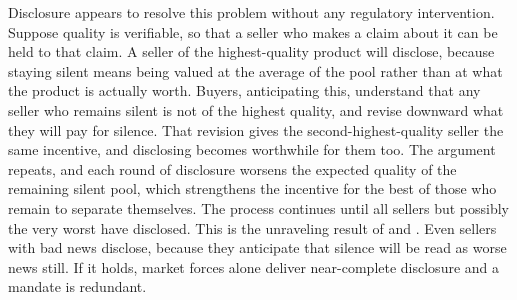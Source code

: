 Disclosure appears to resolve this problem without any regulatory intervention. Suppose quality
is verifiable, so that a seller who makes a claim about it can be held to that claim. A seller
of the highest-quality product will disclose, because staying silent means being valued at the
average of the pool rather than at what the product is actually worth. Buyers, anticipating
this, understand that any seller who remains silent is not of the highest quality, and revise
downward what they will pay for silence. That revision gives the second-highest-quality seller
the same incentive, and disclosing becomes worthwhile for them too. The argument repeats, and each
round of disclosure worsens the expected quality of the remaining silent pool, which strengthens
the incentive for the best of those who remain to separate themselves. The process continues
until all sellers but possibly the very worst have disclosed. This is the unraveling result of
\citet{grossman_informational_1981} and \citet{milgrom_good_1981}. Even sellers with bad news
disclose, because they anticipate that silence will be read as worse news still. If it holds,
market forces alone deliver near-complete disclosure and a mandate is redundant.
